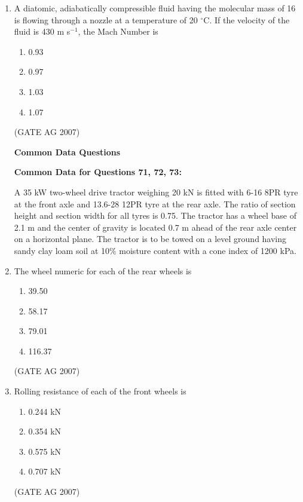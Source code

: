 \documentclass[journal,12pt,onecolumn]{IEEEtran}
\theoremstyle{remark}
\begin{document}
\begin{enumerate}
\item A diatomic, adiabatically compressible fluid having the molecular mass of 16 is flowing through a nozzle at a temperature of 20 $^{\circ}$C. If the velocity of the fluid is 430 m s$^{-1}$, the Mach Number is
\begin{multicols}{4}
\begin{enumerate}
    \item 0.93
    \item 0.97
    \item 1.03
    \item 1.07
\end{enumerate}
\end{multicols}
\hfill(GATE AG 2007)

\begin{center}
\textbf{Common Data Questions}
\end{center}
\textbf{Common Data for Questions 71, 72, 73:}

A 35 kW two-wheel drive tractor weighing 20 kN is fitted with 6-16 8PR tyre at the front axle and 13.6-28 12PR tyre at the rear axle. The ratio of section height and section width for all tyres is 0.75. The tractor has a wheel base of 2.1 m and the center of gravity is located 0.7 m ahead of the rear axle center on a horizontal plane. The tractor is to be towed on a level ground having sandy clay loam soil at 10\% moisture content with a cone index of 1200 kPa.

\item The wheel numeric for each of the rear wheels is
\begin{multicols}{4}
\begin{enumerate}
    \item 39.50
    \item 58.17
    \item 79.01
    \item 116.37
\end{enumerate}
\end{multicols}
\hfill(GATE AG 2007)

\item Rolling resistance of each of the front wheels is
\begin{multicols}{4}
\begin{enumerate}
    \item 0.244 kN
    \item 0.354 kN
    \item 0.575 kN
    \item 0.707 kN
\end{enumerate}
\end{multicols}
\hfill(GATE AG 2007)


\end{enumerate}
\end{document}
